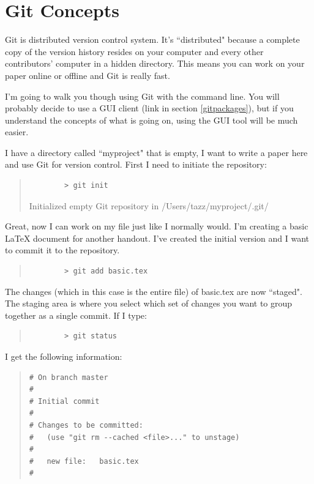 \section{Git Concepts}
\label{sec:concepts}

Git is distributed version control system.  It's ``distributed" because a complete copy of the version history resides on your computer and every other contributors' computer in a hidden directory.  This means you can work on your paper online or offline and Git is really fast.

I'm going to walk you though using Git with the command line.  You will probably decide to use a GUI client (link in section \ref{gitpackages}), but if you understand the concepts of what is going on, using the GUI tool will be much easier.

I have a directory called ``myproject" that is empty, I want to write a paper here and use Git for version control.  First I need to initiate the repository:

\begin{quote}
	\begin{verbatim}
		> git init
	\end{verbatim}
	Initialized empty Git repository in /Users/tazz/myproject/.git/
\end{quote}

Great, now I can work on my file just like I normally would.  I'm creating a basic LaTeX document for another handout.  I've created the initial version and I want to commit it to the repository.

\begin{quote}
	\begin{verbatim}
		> git add basic.tex
	\end{verbatim}
\end{quote}

The changes (which in this case is the entire file) of basic.tex are now ``staged".  The staging area is where you select which set of changes you want to group together as a single commit.  If I type:

\begin{quote}
	\begin{verbatim}
		> git status
	\end{verbatim}
\end{quote}

I get the following information:

\begin{quote}
	\begin{verbatim}
# On branch master
#
# Initial commit
#
# Changes to be committed:
#   (use "git rm --cached <file>..." to unstage)
#
#	new file:   basic.tex
#

\end{verbatim}
\end{quote}

